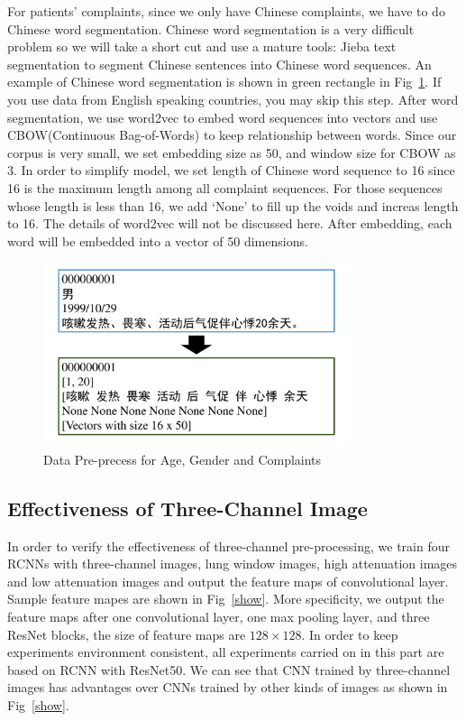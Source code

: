 \documentclass[journal]{IEEEtran}
\begin{document}
For patients' complaints, since we only have Chinese complaints, we have to do Chinese word segmentation. Chinese word segmentation is a very difficult problem so we will take a short cut and use a mature tools: Jieba text segmentation to segment Chinese sentences into Chinese word sequences. An example of Chinese word segmentation is shown in green rectangle in Fig~\ref{textinfo}. If you use data from English speaking countries, you may skip this step.
After word segmentation, we use word2vec \cite{mikolov2013efficient} \cite{mikolov2013distributed} to embed word sequences into vectors and use CBOW(Continuous Bag-of-Words) to keep relationship between words. Since our corpus is very small, we set embedding size as 50, and window size for CBOW as 3. In order to simplify model, we set length of Chinese word sequence to 16 since 16 is the maximum length among all complaint sequences. For those sequences whose length is less than 16, we add `None' to fill up the voids and increas length to 16. The details of word2vec will not be discussed here. After embedding, each word will be embedded into a vector of 50 dimensions.
\begin{figure}[!t]
    \centerline{\includegraphics[width=90mm]{textinfo.pdf}}
    \vspace{-0cm}
    \caption{Data Pre-precess for Age, Gender and Complaints}
    \vspace{-0cm}
    \label{textinfo}
    \end{figure}


\subsection{Effectiveness of Three-Channel Image}
\label{effectiveness}
In order to verify the effectiveness of three-channel pre-processing, we train four RCNNs with three-channel images, lung window images, high attenuation images and low attenuation images and output the feature maps of convolutional layer. Sample feature mapes are shown in Fig~\ref{show}. More specificity, we output the feature maps after one convolutional layer, one max pooling layer, and three ResNet blocks, the size of feature maps are $128 \times 128$. In order to keep experiments environment consistent, all experiments carried on in this part are based on RCNN with ResNet50. We can see that CNN trained by three-channel images has advantages over CNNs trained by other kinds of images as shown in Fig~\ref{show}. 
\end{document}
